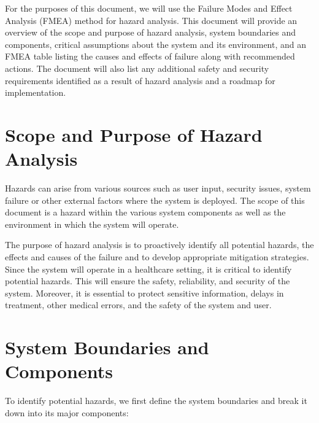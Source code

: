 \documentclass{article}
\begin{document}
For the purposes of this document, we will use the Failure Modes and Effect Analysis (FMEA) method for hazard analysis. This document will provide an overview of the scope and purpose of hazard analysis, system boundaries and components, critical assumptions about the system and its environment, and an FMEA table listing the causes and effects of failure along with recommended actions. The document will also list any additional safety and security requirements identified as a result of hazard analysis and a roadmap for implementation.

\section{Scope and Purpose of Hazard Analysis}

Hazards can arise from various sources such as user input, security issues, system failure or other external factors where the system is deployed. The scope of this document is a hazard within the various system components as well as the environment in which the system will operate.

The purpose of hazard analysis is to proactively identify all potential hazards, the effects and causes of the failure and to develop appropriate mitigation strategies. Since the system will operate in a healthcare setting, it is critical to identify potential hazards. This will ensure the safety, reliability, and security of the system. Moreover, it is essential to protect sensitive information, delays in treatment, other medical errors, and the safety of the system and user. 

\section{System Boundaries and Components}

To identify potential hazards, we first define the system boundaries and break it down into its major components:
\end{document}

